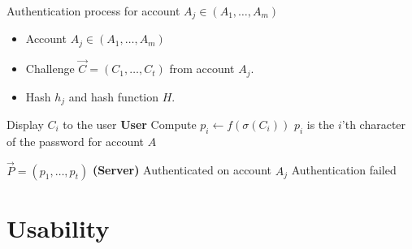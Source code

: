 \begin{algorithm}
    \caption{Authentication process for account $A_j \in (A_1,\dots,A_m)$}\label{auth-proccess}
    \begin{algorithmic}[1]
        \Require
            \Statex \begin{itemize}
                \item Account $A_j \in (A_1,\dots, A_m)$
                \item Challenge $\vec C = (C_1,\dots,C_t)$ from account $A_j$.
                \item Hash $h_j$ and hash function $H$.
            \end{itemize}

                \State Display $C_i$ to the user
                \State \textbf{User} Compute $p_i \leftarrow f(\sigma(C_i))$
                \State
                \Comment $p_i$ is the $i$'th character of the password for account $A$
            \EndFor

            \State $\vec P = (p_1,\dots,p_t)$
            \Comment \textbf{(Server)} 
                \State Authenticated on account $A_j$
            \Else 
                \State Authentication failed
            \EndIf

    \end{algorithmic}
    \label{auth-algo}
\end{algorithm}

\clearpage
\section{Usability}
